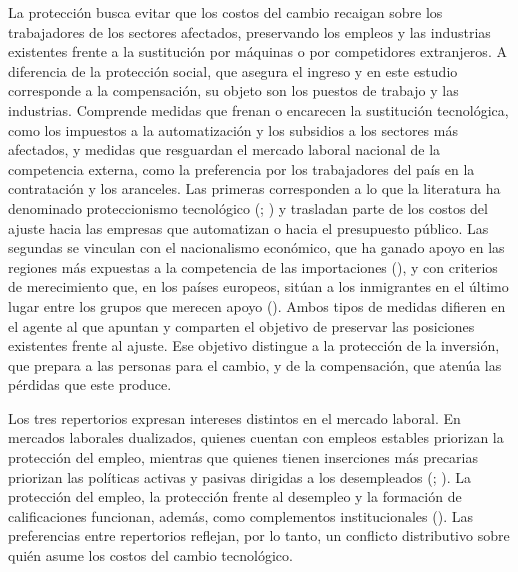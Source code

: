 \documentclass[
  spanish,
  12pt,
]{article}
\begin{document}
La protección busca evitar que los costos del cambio recaigan sobre los
trabajadores de los sectores afectados, preservando los empleos y las
industrias existentes frente a la sustitución por máquinas o por
competidores extranjeros. A diferencia de la protección social, que
asegura el ingreso y en este estudio corresponde a la compensación, su
objeto son los puestos de trabajo y las industrias. Comprende medidas
que frenan o encarecen la sustitución tecnológica, como los impuestos a
la automatización y los subsidios a los sectores más afectados, y
medidas que resguardan el mercado laboral nacional de la competencia
externa, como la preferencia por los trabajadores del país en la
contratación y los aranceles. Las primeras corresponden a lo que la
literatura ha denominado proteccionismo tecnológico
(;
) y
trasladan parte de los costos del ajuste hacia las empresas que
automatizan o hacia el presupuesto público. Las segundas se vinculan con
el nacionalismo económico, que ha ganado apoyo en las regiones más
expuestas a la competencia de las importaciones
(), y con
criterios de merecimiento que, en los países europeos, sitúan a los
inmigrantes en el último lugar entre los grupos que merecen apoyo
(). Ambos
tipos de medidas difieren en el agente al que apuntan y comparten el
objetivo de preservar las posiciones existentes frente al ajuste. Ese
objetivo distingue a la protección de la inversión, que prepara a las
personas para el cambio, y de la compensación, que atenúa las pérdidas
que este produce.

Los tres repertorios expresan intereses distintos en el mercado laboral.
En mercados laborales dualizados, quienes cuentan con empleos estables
priorizan la protección del empleo, mientras que quienes tienen
inserciones más precarias priorizan las políticas activas y pasivas
dirigidas a los desempleados
(;
). La protección del
empleo, la protección frente al desempleo y la formación de
calificaciones funcionan, además, como complementos institucionales
(). Las
preferencias entre repertorios reflejan, por lo tanto, un conflicto
distributivo sobre quién asume los costos del cambio tecnológico.
\end{document}

